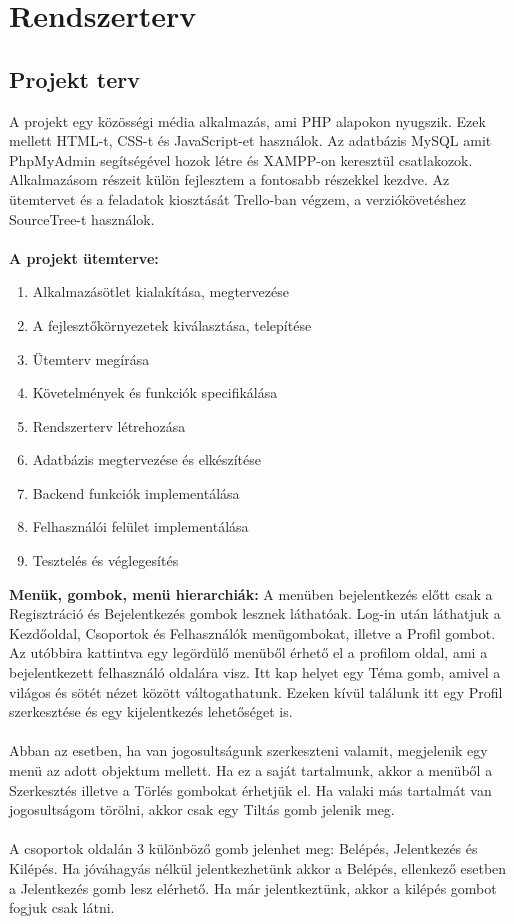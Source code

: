 \documentclass[
]{thesis-ekf}
\theoremstyle{definition}
\theoremstyle{remark}
\begin{document}
\section{Rendszerterv}

\subsection{Projekt terv}

A projekt egy közösségi média alkalmazás, ami PHP alapokon nyugszik. Ezek mellett HTML-t, CSS-t és JavaScript-et használok. Az adatbázis MySQL amit PhpMyAdmin segítségével hozok létre és XAMPP-on keresztül csatlakozok. Alkalmazásom részeit külön fejlesztem a fontosabb részekkel kezdve. Az ütemtervet és a feladatok kiosztását Trello-ban végzem, a verziókövetéshez SourceTree-t használok. 
\\\\
\textbf{A projekt ütemterve:}
\begin{enumerate}
	\item Alkalmazásötlet kialakítása, megtervezése
	\item A fejlesztőkörnyezetek kiválasztása, telepítése
	\item Ütemterv megírása
	\item Követelmények és funkciók specifikálása
	\item Rendszerterv létrehozása
	\item Adatbázis megtervezése és elkészítése
	\item Backend funkciók implementálása
	\item Felhasználói felület implementálása
	\item Tesztelés és véglegesítés
\end{enumerate}
\noindent
\textbf{Menük, gombok, menü hierarchiák:}
A menüben bejelentkezés előtt csak a Regisztráció és Bejelentkezés gombok lesznek láthatóak. Log-in után láthatjuk a Kezdőoldal, Csoportok és Felhasználók menügombokat, illetve a Profil gombot. Az utóbbira kattintva egy legördülő menüből érhető el a profilom oldal, ami a bejelentkezett felhasználó oldalára visz. Itt kap helyet egy Téma gomb, amivel a világos és sötét nézet között váltogathatunk. Ezeken kívül találunk itt egy Profil szerkesztése és egy kijelentkezés lehetőséget is.
\\\\
Abban az esetben, ha van jogosultságunk szerkeszteni valamit, megjelenik egy menü az adott objektum mellett. Ha ez a saját tartalmunk, akkor a menüből a Szerkesztés illetve a Törlés gombokat érhetjük el. Ha valaki más tartalmát van jogosultságom törölni, akkor csak egy Tiltás gomb jelenik meg.
\\\\
A csoportok oldalán 3 különböző gomb jelenhet meg: Belépés, Jelentkezés és Kilépés. Ha jóváhagyás nélkül jelentkezhetünk akkor a Belépés, ellenkező esetben a Jelentkezés gomb lesz elérhető. Ha már jelentkeztünk, akkor a kilépés gombot fogjuk csak látni.
\end{document}
